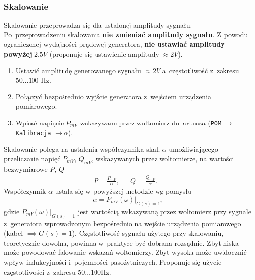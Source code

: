 \documentclass[paper=a4,DIV=12]{lpas}
\begin{document}
\subsubsection{Skalowanie}
\label{sec:XW8AC}

Skalowanie przeprowadza się dla ustalonej amplitudy sygnału. Po~przeprowadzeniu
skalowania \textbf{nie zmieniać amplitudy sygnału}. Z~powodu ograniczonej
wydajności prądowej generatora, \textbf{nie ustawiać amplitudy powyżej $2.5V$}
(proponuje się ustawienie amplitudy $\approx 2V$).
\begin{enumerate}
  \item Ustawić amplitudę generowanego sygnału $\approx 2V$ a~częstotliwość
    z~zakresu $50\dots100\text{ Hz}$.
  \item Połączyć bezpośrednio wyjście generatora z~wejściem urządzenia
    pomiarowego.
  \item Wpisać napięcie $P_{mV}$ wskazywane przez woltomierz do~arkusza
    (\texttt{POM} $\rightarrow$ \texttt{Kalibracja} $\rightarrow \alpha$).
\end{enumerate}

Skalowanie polega na ustaleniu współczynnika skali $\alpha$ umożliwiającego
przeliczanie napięć $P_{mV}$, $Q_{mV}$, wskazywanych przez woltomierze, na
wartości bezwymiarowe $P$, $Q$
\begin{equation}
  \begin{aligned}
    & P = \frac{P_{mV}}{\alpha}, && Q = \frac{Q_{mV}}{\alpha}. &&
  \end{aligned}
  \label{eq:IP4D4}
\end{equation}
Współczynnik $\alpha$ ustala się w~powyższej metodzie wg pomysłu
\begin{equation}
  \alpha = \left.P_{mV}(\omega)\right|_{G(s) = 1},
  \label{eq:57L58}
\end{equation}
gdzie $\left.P_{mV}(\omega)\right|_{G(s) = 1}$ jest wartością wskazywaną przez
woltomierz przy sygnale z~generatora wprowadzonym bezpośrednio na wejście
urządzenia pomiarowego (kabel $\implies G(s) = 1$). Częstotliwość sygnału
użytego przy skalowaniu, teoretycznie dowolna, powinna w~praktyce być dobrana
rozsądnie. Zbyt niska może powodować falowanie wskazań woltomierzy. Zbyt wysoka
może uwidocznić wpływ indukcyjności i~pojemności pasożytniczych. Proponuje się
użycie częstotliwości z~zakresu $50\dots100\text{Hz}$.
\end{document}
